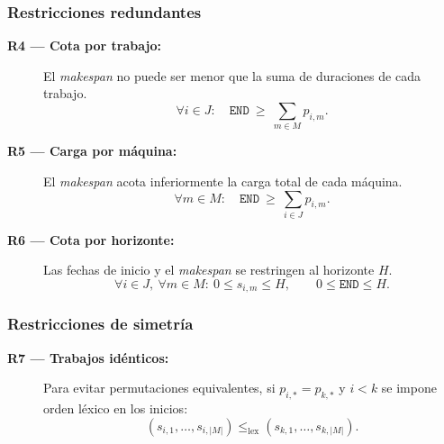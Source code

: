 \subsubsection*{Restricciones redundantes}
\begin{description}
  \item[\textbf{R4 — Cota por trabajo:}] El \emph{makespan} no puede ser menor que la suma de duraciones de cada trabajo.
        \[
          \forall i\in J:\quad \texttt{END}\ \ge\ \sum_{m\in M} p_{i,m}.
        \]

  \item[\textbf{R5 — Carga por máquina:}] El \emph{makespan} acota inferiormente la carga total de cada máquina.
        \[
          \forall m\in M:\quad \texttt{END}\ \ge\ \sum_{i\in J} p_{i,m}.
        \]

  \item[\textbf{R6 — Cota por horizonte:}] Las fechas de inicio y el \emph{makespan} se restringen al horizonte \(H\).
        \[
          \forall i\in J,\ \forall m\in M:\ 0\le s_{i,m}\le H,
          \qquad 0\le \texttt{END}\le H.
        \]
\end{description}

\subsubsection*{Restricciones de simetría}
\begin{description}
  \item[\textbf{R7 — Trabajos idénticos:}] Para evitar permutaciones equivalentes, si \(p_{i,*}=p_{k,*}\) y \(i<k\) se impone orden léxico en los inicios:
        \[
          (s_{i,1},\dots,s_{i,|M|}) \le_{\text{lex}} (s_{k,1},\dots,s_{k,|M|}).
        \]
\end{description}
